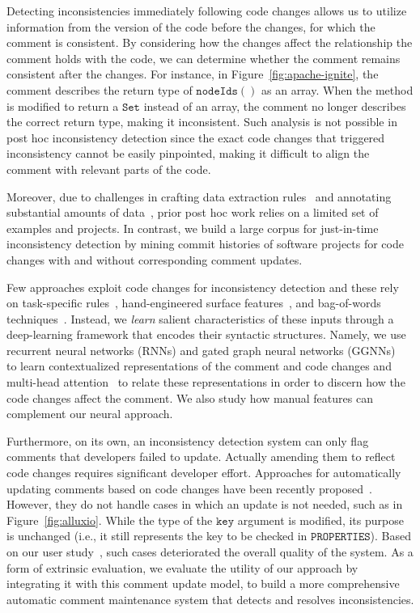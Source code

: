 \documentclass[letterpaper]{article} %
\newcommand{\CodeIn}[1]{{\ifmmode{\mathtt{#1}}\else$\mathtt{#1}$\fi}}
\newcommand{\Posthoc}{post hoc}
\newcommand{\JustInTime}{just-in-time}
\begin{document}
Detecting inconsistencies immediately following code changes allows us to utilize information from the version of the code before the changes, for which the comment is consistent. By considering how the changes affect the relationship the comment holds with the code, we can determine whether the comment remains consistent after the changes. For instance, in Figure~\ref{fig:apache-ignite}, the comment describes the return type of \CodeIn{nodeIds()} as an array. When the method is modified to return a \CodeIn{Set} instead of an array, the comment no longer describes the correct return type, making it inconsistent. Such analysis is not possible in \Posthoc{} inconsistency detection since the exact code changes that triggered inconsistency cannot be easily pinpointed, making it difficult to align the comment with relevant parts of the code. 

Moreover, due to challenges in crafting  data extraction rules~\cite{icomment2007,aComment} and annotating substantial amounts of data~\cite{Corazza18}, prior \Posthoc{} work relies on a limited set of examples and projects. In contrast, we build a large corpus for \JustInTime{} inconsistency detection by mining commit histories of software projects for  code changes with and without corresponding comment updates.


Few approaches exploit code changes for inconsistency detection and these rely on task-specific rules~\cite{SaduThesis}, hand-engineered surface features~\cite{LiuOutdatedLine,Malik08}, and bag-of-words techniques~\cite{LiuOutdatedLine}.
Instead, we  \textit{learn} salient characteristics of these inputs through a deep-learning framework that encodes their syntactic structures. Namely, we use recurrent neural networks (RNNs) and gated graph neural networks (GGNNs)~\cite{Li2016GatedGS} to learn contextualized representations of the comment and code changes and multi-head attention~\cite{transformer}
to relate these representations in order to discern how the code changes affect the comment. We also study how manual features can complement our neural approach.

Furthermore, on its own,
an inconsistency detection system can only flag comments that developers failed to update. Actually amending them to reflect code changes requires significant developer effort. Approaches for automatically updating comments based on code changes have been recently proposed~\cite{panthaplackel2020update, LiuJITUpdate}. However, they do not handle cases in which an update is not needed, such as in 
Figure~\ref{fig:alluxio}. While the type of the \CodeIn{key} argument is modified, its purpose is unchanged (i.e., it still represents the key to be checked in \CodeIn{PROPERTIES}). Based on our user study~\cite{panthaplackel2020update}, such cases deteriorated the overall quality of the system.
As a form of extrinsic evaluation, we evaluate the utility of our approach by integrating
it with this comment update model, to build a more comprehensive automatic comment maintenance system that detects and resolves inconsistencies.
\end{document}
